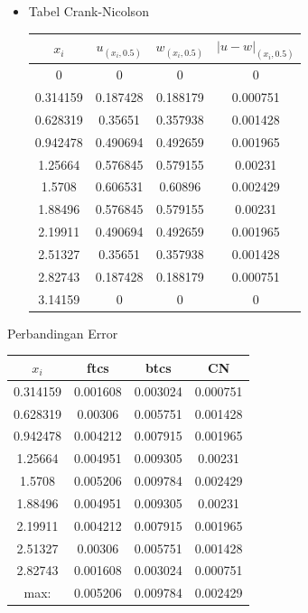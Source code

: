 \documentclass[paper=a4, fontsize=11pt]{scrartcl}
\numberwithin{equation}{section} %
\numberwithin{figure}{section} %
\numberwithin{table}{section} %
\begin{document}
\begin{itemize}
\newpage
\item Tabel Crank-Nicolson
\begin{table}[ht]
\begin{tabular}{c c c c}
\hline
$x_{i}$ & $u_{(x_{i}, 0.5)}$ & $w_{(x_{i}, 0.5)}$ & $\vert u - w \vert _{(x_{i}, 0.5)}$  \\ [0.5ex]
\hline 
0	& 0	& 0	& 0\\
0.314159	 & 0.187428	& 0.188179	& 0.000751\\
0.628319 &	0.35651	& 0.357938	& 0.001428\\
0.942478	 & 0.490694	& 0.492659	& 0.001965\\
1.25664	& 0.576845	& 0.579155	& 0.00231\\
1.5708	& 0.606531	& 0.60896	& 0.002429\\
1.88496	& 0.576845	& 0.579155	& 0.00231\\
2.19911	& 0.490694	& 0.492659	& 0.001965\\
2.51327	& 0.35651	& 0.357938	& 0.001428\\
2.82743	& 0.187428	& 0.188179	& 0.000751\\
3.14159	& 0	& 0	& 0 \\ [1ex]
\hline 
\end{tabular}
\end{table}
\end{itemize}

Perbandingan Error
\begin{table}[ht]
\begin{tabular}{c c c c}
\hline
$x_{i}$ & 	ftcs	 & btcs	& CN \\ [0.5ex]
\hline 
0.314159 & 	0.001608 & 	0.003024	 & 0.000751\\
0.628319	 & 0.00306	& 0.005751	& 0.001428\\
0.942478	 & 0.004212	& 0.007915	& 0.001965\\
1.25664	& 0.004951	& 0.009305	& 0.00231\\
1.5708	& 0.005206	& 0.009784	& 0.002429\\
1.88496	& 0.004951	& 0.009305	& 0.00231\\
2.19911	& 0.004212	& 0.007915	& 0.001965\\
2.51327	& 0.00306	& 0.005751	& 0.001428\\
2.82743	& 0.001608	& 0.003024	& 0.000751\\ [0.5ex]
\hline
max:	& 0.005206	& 0.009784	& 0.002429\\ [0.5ex]
\hline 
\end{tabular}
\end{table}
\end{document}
